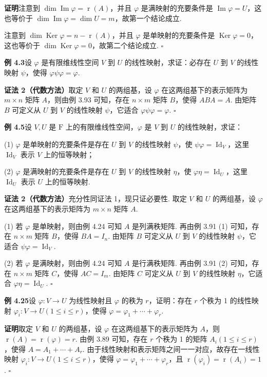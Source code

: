 \documentclass[UTF8, 12pt, fontset=fandol, oneside]{ctexart}
\begin{document}
\noindent\textbf{证明}\quad 注意到 $\dim\operatorname{Im}\varphi=\operatorname{r}(A)$，并且 $\varphi$ 是满映射的充要条件是 $\operatorname{Im}\varphi=U$，这也等价于 $\dim\operatorname{Im}\varphi=\dim U=m$，故第一个结论成立.

注意到 $\dim\operatorname{Ker}\varphi=n-\operatorname{r}(A)$，并且 $\varphi$ 是单映射的充要条件是 $\operatorname{Ker}\varphi=0$，这也等价于 $\dim\operatorname{Ker}\varphi=0$，故第二个结论成立. $\square$

\noindent\textbf{例 4.3}\quad 设 $\varphi$ 是有限维线性空间 $V$ 到 $U$ 的线性映射，求证：必存在 $U$ 到 $V$ 的线性映射 $\psi$，使得 $\varphi\psi\varphi=\varphi$.

\noindent\textbf{证法 2（代数方法）}\quad 取定 $V$ 和 $U$ 的两组基，设 $\varphi$ 在这两组基下的表示矩阵为 $m\times n$ 矩阵 $A$，则由例 3.93 可知，存在 $n\times m$ 矩阵 $B$，使得 $ABA=A$. 由矩阵 $B$ 可定义从 $U$ 到 $V$ 的线性映射 $\psi$，它适合 $\varphi\psi\varphi=\varphi$. $\square$

\noindent\textbf{例 4.5}\quad 设 $V,U$ 是 $\mathrm{F}$ 上的有限维线性空间，$\varphi$ 是 $V$ 到 $U$ 的线性映射，求证：

(1) $\varphi$ 是单映射的充要条件是存在 $U$ 到 $V$ 的线性映射 $\psi$，使 $\psi\varphi=\operatorname{Id}_V$，这里 $\operatorname{Id}_V$ 表示 $V$ 上的恒等映射；

(2) $\varphi$ 是满映射的充要条件是存在 $U$ 到 $V$ 的线性映射 $\eta$，使 $\varphi\eta=\operatorname{Id}_U$，这里 $\operatorname{Id}_U$ 表示 $U$ 上的恒等映射.

\noindent\textbf{证法 2（代数方法）}\quad 充分性同证法 1，现只证必要性. 取定 $V$ 和 $U$ 的两组基，设 $\varphi$ 在这两组基下的表示矩阵为 $m\times n$ 矩阵 $A$.

(1) 若 $\varphi$ 是单映射，则由例 4.24 可知 $A$ 是列满秩矩阵. 再由例 3.91 (1) 可知，存在 $n\times m$ 矩阵 $B$，使得 $BA=I_n$. 由矩阵 $B$ 可定义从 $U$ 到 $V$ 的线性映射 $\psi$，它适合 $\psi\varphi=\operatorname{Id}_V$.

(2) 若 $\varphi$ 是满映射，则由例 4.24 可知 $A$ 是行满秩矩阵. 再由例 3.91 (2) 可知，存在 $n\times m$ 矩阵 $C$，使得 $AC=I_m$. 由矩阵 $C$ 可定义从 $U$ 到 $V$ 的线性映射 $\eta$，它适合 $\varphi\eta=\operatorname{Id}_U$. $\square$

\noindent\textbf{例 4.25}\quad 设 $\varphi:V\to U$ 为线性映射且 $\varphi$ 的秩为 $r$，证明：存在 $r$ 个秩为 1 的线性映射 $\varphi_i:V\to U(1\le i\le r)$，使得 $\varphi=\varphi_1+\cdots+\varphi_r$.

\noindent\textbf{证明}\quad 取定 $V$ 和 $U$ 的两组基，设 $\varphi$ 在这两组基下的表示矩阵为 $A$，则 $\operatorname{r}(A)=\operatorname{r}(\varphi)=r$. 由例 3.89 可知，存在 $r$ 个秩为 1 的矩阵 $A_i(1\le i\le r)$，使得 $A=A_1+\cdots+A_r$. 由于线性映射和表示矩阵之间一一对应，故存在一线性映射 $\varphi_i:V\to U(1\le i\le r)$，使得 $\varphi=\varphi_1+\cdots+\varphi_r$，且 $\operatorname{r}(\varphi_i)=\operatorname{r}(A_i)=1$. $\square$
\end{document}
